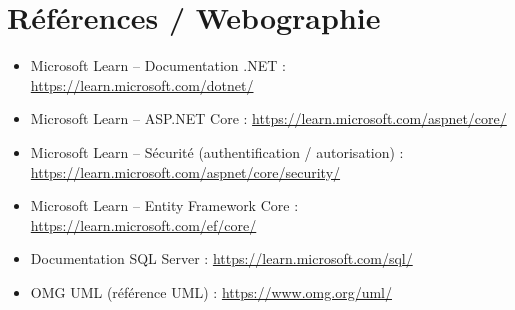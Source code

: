 \documentclass[12pt,a4paper]{report}
\begin{document}
\chapter*{Références / Webographie}

\begin{itemize}
    \item Microsoft Learn -- Documentation .NET : \url{https://learn.microsoft.com/dotnet/}
    \item Microsoft Learn -- ASP.NET Core : \url{https://learn.microsoft.com/aspnet/core/}
    \item Microsoft Learn -- Sécurité (authentification / autorisation) : \url{https://learn.microsoft.com/aspnet/core/security/}
    \item Microsoft Learn -- Entity Framework Core : \url{https://learn.microsoft.com/ef/core/}
    \item Documentation SQL Server : \url{https://learn.microsoft.com/sql/}
    \item OMG UML (référence UML) : \url{https://www.omg.org/uml/}
\end{itemize}
\end{document}

